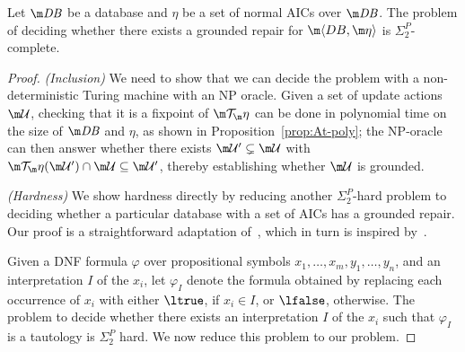 \begin{proposition}
  \label{prop:grounded-complexity}
  Let $\db$ be a database and $\eta$ be a set of normal AICs over $\db$.
  The problem of deciding whether there exists a  grounded repair for $\fulldb$ is $\Sigma^P_2$-complete.
\end{proposition}
\begin{proof}
  \emph{(Inclusion)} We need to show that we can decide the problem with a non-deterministic Turing machine with an NP oracle.
  Given a set of update actions $\UU$, checking that it is a fixpoint of $\Op$ can be done in polynomial time on the size of $\db$ and $\eta$, as shown in Proposition~\ref{prop:At-poly}; the NP-oracle can then answer whether there exists $\UU'\subsetneq\UU$ with $\Op(\UU')\cap\UU\subseteq\UU'$, thereby establishing whether $\UU$ is grounded.

  \emph{(Hardness)}
  We show hardness directly by reducing another $\Sigma^P_2$-hard problem to deciding whether a particular database with a set of AICs has a grounded repair.  Our proof is a straightforward adaptation of~\citep[Theorem~5.7]{ai/BogaertsVD15}, which in turn is inspired by~\citep[Theorem 6.12]{DeneckerMT04}.

  Given a DNF formula $\varphi$ over  propositional symbols $x_1,\ldots,x_m,y_1,\ldots,y_n$, and an interpretation $I$ of the $x_i$, let $\varphi_I$ denote the formula obtained by replacing each occurrence of $x_i$ with either $\ltrue$, if $x_i\in I$, or $\lfalse$, otherwise. 
  The problem to decide whether there exists an interpretation $I$ of the $x_i$ such that $\varphi_I$ is a tautology is $\Sigma^P_2$ hard. We now reduce this problem to our problem. 
  

\end{proof}

